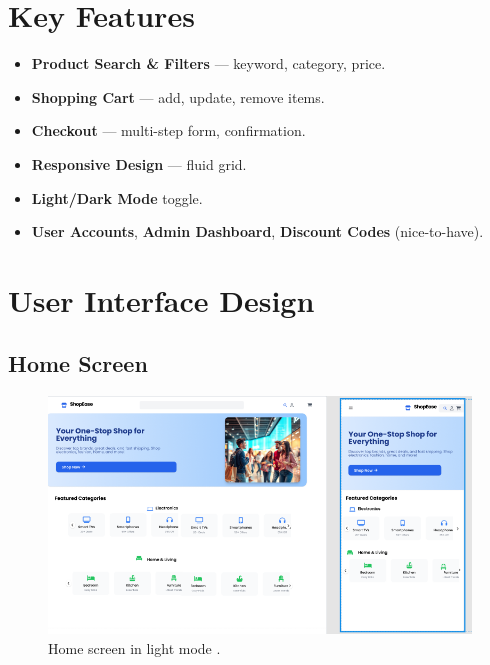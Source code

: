 \documentclass[11pt,a4paper]{article}
\begin{document}
	\section{Key Features}
	\begin{itemize}
		\item \textbf{Product Search \& Filters} — keyword, category, price.
		\item \textbf{Shopping Cart} — add, update, remove items.
		\item \textbf{Checkout} — multi-step form, confirmation.
		\item \textbf{Responsive Design} — fluid grid.
		\item \textbf{Light/Dark Mode} toggle.
		\item \textbf{User Accounts}, \textbf{Admin Dashboard}, \textbf{Discount Codes} (nice-to-have).
	\end{itemize}
	
\section{User Interface Design}

\subsection{Home Screen}

\begin{figure}[H]
	\centering
	\includegraphics[width=\linewidth]{Home_Figma.png}%
	\caption{Home screen in light mode .}
	\label{fig:ui-home}
\end{figure}
\end{document}
